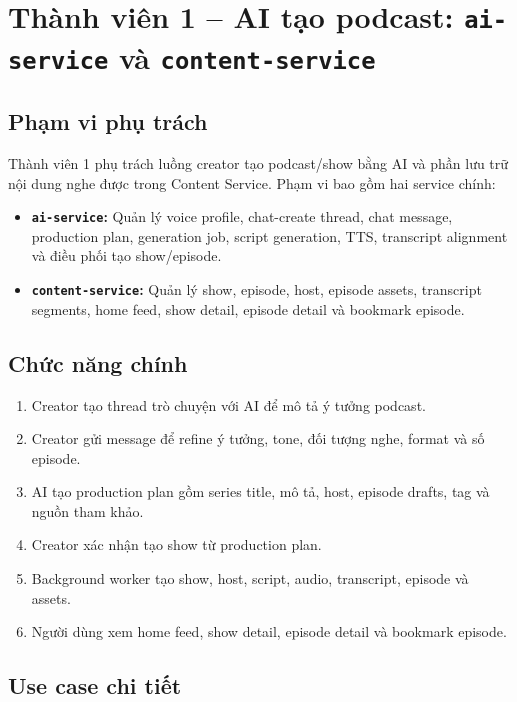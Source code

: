 \documentclass[14pt,a4paper,oneside]{extreport}
\begin{document}
\section{Thành viên 1 -- AI tạo podcast: \texttt{ai-service} và \texttt{content-service}}
\label{sec:phase3-ai-content}

\subsection{Phạm vi phụ trách}

Thành viên 1 phụ trách luồng creator tạo podcast/show bằng AI và phần lưu trữ nội dung nghe được trong Content Service. Phạm vi bao gồm hai service chính:

\begin{itemize}[leftmargin=2cm]
  \item \textbf{\texttt{ai-service}:} Quản lý voice profile, chat-create thread, chat message, production plan, generation job, script generation, TTS, transcript alignment và điều phối tạo show/episode.
  \item \textbf{\texttt{content-service}:} Quản lý show, episode, host, episode assets, transcript segments, home feed, show detail, episode detail và bookmark episode.
\end{itemize}

\subsection{Chức năng chính}

\begin{enumerate}[leftmargin=2cm]
  \item Creator tạo thread trò chuyện với AI để mô tả ý tưởng podcast.
  \item Creator gửi message để refine ý tưởng, tone, đối tượng nghe, format và số episode.
  \item AI tạo production plan gồm series title, mô tả, host, episode drafts, tag và nguồn tham khảo.
  \item Creator xác nhận tạo show từ production plan.
  \item Background worker tạo show, host, script, audio, transcript, episode và assets.
  \item Người dùng xem home feed, show detail, episode detail và bookmark episode.
\end{enumerate}

\subsection{Use case chi tiết}
\end{document}
